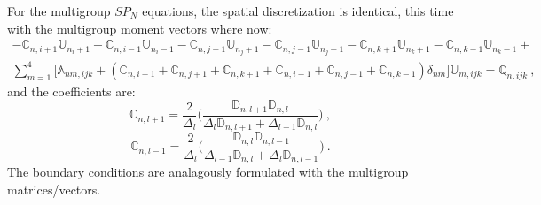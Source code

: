 For the multigroup $SP_N$ equations, the spatial discretization is
identical, this time with the multigroup moment vectors where now:
\begin{multline}
  - \mathbb{C}_{n,i+1} \mathbb{U}_{n_i+1} - \mathbb{C}_{n,i-1}
  \mathbb{U}_{n_i-1} - \mathbb{C}_{n,j+1} \mathbb{U}_{n_j+1} -
  \mathbb{C}_{n,j-1} \mathbb{U}_{n_j-1} - \mathbb{C}_{n,k+1}
  \mathbb{U}_{n_k+1} - \mathbb{C}_{n,k-1} \mathbb{U}_{n_k-1}
  +\\ \sum_{m=1}^4 \Big[\mathbb{A}_{nm,ijk} +
    (\mathbb{C}_{n,i+1}+\mathbb{C}_{n,j+1}+\mathbb{C}_{n,k+1}+
    \mathbb{C}_{n,i-1}+\mathbb{C}_{n,j-1}+\mathbb{C}_{n,k-1})\delta_{nm}\Big]
  \mathbb{U}_{m,ijk} = \mathbb{Q}_{n,ijk}\:,
  \label{eq:discrete_mg_space_spn}
\end{multline}
and the coefficients are:
\begin{equation}
  \mathbb{C}_{n,l+1} = \frac{2}{\Delta_l}\Bigg( \frac{\mathbb{D}_{n,l+1}
    \mathbb{D}_{n,l}}{\Delta_l \mathbb{D}_{n,l+1} + \Delta_{l+1} \mathbb{D}_{n,l}}\Bigg)\:,
  \label{eq:mg_coeff_plus}
\end{equation}
\begin{equation}
  \mathbb{C}_{n,l-1} = \frac{2}{\Delta_l}\Bigg( \frac{\mathbb{D}_{n,l}
    \mathbb{D}_{n,l-1}}{\Delta_{l-1} \mathbb{D}_{n,l} + \Delta_{l}
    \mathbb{D}_{n,l-1}}\Bigg)\:.
  \label{eq:mg_coeff_minus}
\end{equation}
The boundary conditions are analagously formulated with the multigroup
matrices/vectors.
